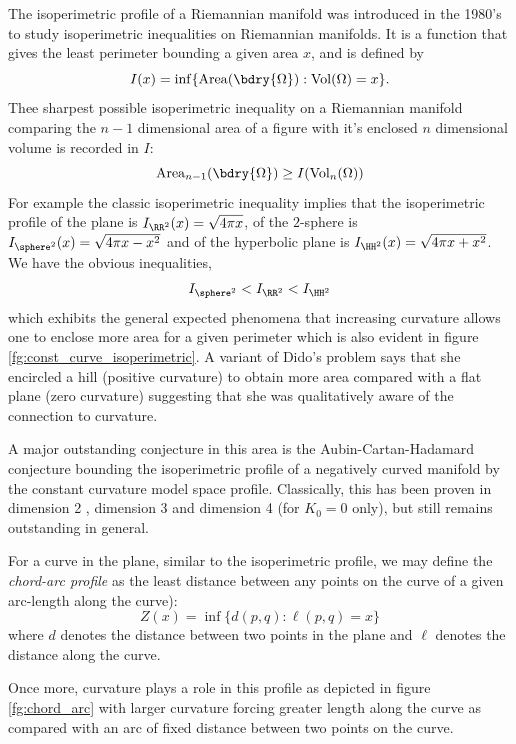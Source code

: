 \documentclass[12pt]{amsart}
\begin{document}
The isoperimetric profile of a Riemannian manifold was introduced in the 1980's \cite{MR875084,MR999971} to study isoperimetric inequalities on Riemannian manifolds. It is a function that gives the least perimeter bounding a given area $x$, and is defined by
\[
I(x) = \inf\{\operatorname{Area} (\bdry{\Omega}) : \operatorname{Vol}(\Omega) = x\}.
\]
Thee sharpest possible isoperimetric inequality on a Riemannian manifold comparing the $n-1$ dimensional area of a figure with it's enclosed $n$ dimensional volume is recorded in $I$:
\[
\operatorname{Area}_{n-1} (\bdry{\Omega}) \geq I(\operatorname{Vol}_n(\Omega))
\]
For example the classic isoperimetric inequality implies that the isoperimetric profile of the plane is $I_{\RR^2}(x) = \sqrt{4\pi x}$, of the $2$-sphere is $I_{\sphere^2}(x) = \sqrt{4\pi x - x^2}$ and of the hyperbolic plane is $I_{\HH^2} (x) = \sqrt{4\pi x + x^2}$. We have the obvious inequalities,
\[
I_{\sphere^2} < I_{\RR^2} < I_{\HH^2}
\]
which exhibits the general expected phenomena that increasing curvature allows one to enclose more area for a given perimeter which is also evident in figure \ref{fg:const_curve_isoperimetric}. A variant of Dido's problem says that she encircled a hill (positive curvature) to obtain more area compared with a flat plane (zero curvature) suggesting that she was qualitatively aware of the connection to curvature.

A major outstanding conjecture in this area is the Aubin-Cartan-Hadamard conjecture \cite{MR0448404, MR936419} bounding the isoperimetric profile of a negatively curved manifold by the constant curvature model space profile. Classically, this has been proven in dimension 2 \cite{zbMATH02588223}, dimension 3 \cite{MR1156385,MR2167269} and dimension 4 \cite{MR608287} (for $K_0 = 0$ only), but still remains outstanding in general.

For a curve in the plane, similar to the isoperimetric profile, we may define the \emph{chord-arc profile} as the least distance between any points on the curve of a given arc-length along the curve):
\[
Z(x) = \inf\{d(p, q) : \ell(p, q) = x\}
\]
where $d$ denotes the distance between two points in the plane and $\ell$ denotes the distance along the curve.

Once more, curvature plays a role in this profile as depicted in figure \ref{fg:chord_arc} with larger curvature forcing greater length along the curve as compared with an arc of fixed distance between two points on the curve.
\end{document}
